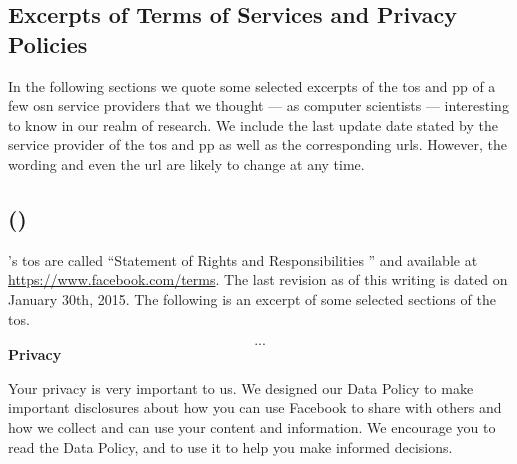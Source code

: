 \documentclass[showtrims,oldfontcommands]{kthesis}
\makeatletter
\newcommand*{\greek}[1]{%
   \expandafter\@greek\csname c@#1\endcsname
}
\newcommand*{\@greek}[1]{%
   $\ifcase#1\or\alpha\or\beta\or\gamma\or\delta\or\varepsilon
     \or\zeta\or\eta\or\theta\or\iota\or\kappa\or\lambda
     \or\mu\or\nu\or\xi\or o\or\pi\or\varrho\or\sigma
     \or\tau\or\upsilon\or\phi\or\chi\or\psi\or\omega
     \else\@ctrerr\fi$%
}
\makeatother
\begin{document}
\begin{appendices}
    \addappheadtotoc
    \renewcommand\thechapter{\greek{chapter}}
    \renewcommand\thesection{\thechapter.\greek{section}}

    \chapter{Excerpts of Terms of Services and Privacy Policies}
        \label{chapter:excerpts-of-tos-and-pp}
    
    In the following sections we quote some selected excerpts of the \ac{tos} and 
    \ac{pp} of a few \ac{osn} service providers that we thought --- as computer 
    scientists --- interesting to know in our realm of research. We include the 
    last update date stated by the service provider of the \ac{tos} and \ac{pp} 
    as well as the corresponding \acp{url}. However, the wording and even the \ac{url} 
    are likely to change at any time.

    \section[\Facebook]{\Facebook (\FacebookInc)}
        \label{section:excerpts-facebook}
    \Facebook's \acs{tos} are called ``Statement of Rights and Responsibilities
    '' and available at \url{https://www.facebook.com/terms}. The last revision as of 
    this writing is dated on January 30th, 2015. The following is an excerpt of some 
    selected sections of the \ac{tos}.

    \begin{quote_tos}
        \[...\]
        \textbf{Privacy}

        Your privacy is very important to us. We designed our Data Policy to make important 
        disclosures about how you can use Facebook to share with others and how we collect 
        and can use your content and information. We encourage you to read the Data Policy, 
        and to use it to help you make informed decisions. 

        \vspace{\baselineskip}


\end{quote_tos}
\end{appendices}
\end{document}
